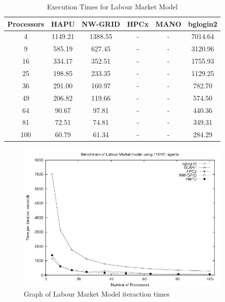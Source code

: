 {
\renewcommand{\arraystretch}{1.25}
\begin{table}[ht]
 \centering
  \begin{tabular}{c|ccccc}
 Processors &HAPU  &NW-GRID &HPCx  &MANO   &bglogin2 \\ \hline
 4   &1149.21   &1388.55  &-   &-   &7014.64  \\
 9   &585.19   &627.45   &-   &-   &3120.96  \\
 16   &334.17   &352.51   &-   &-   &1755.93  \\
 25   &198.85   &233.35   &-   &-   &1129.25   \\
 36   &291.00   &160.97   &-   &-   &782.70   \\
 49   &206.82   &119.66   &-   &-   &574.50   \\
 64   &90.67   &97.81   &-   &-   &440.36   \\
 81   &72.51   &74.81   &-   &-   &349.31   \\
 100   &60.79   &61.34   &-   &-   &284.29   \\
 \end{tabular}
 \caption{Execution Times for Labour Market Model}
 \label{tab:ExecutionTimesForLabour}
\end{table}
}
\bigskip
\begin{figure}[ht]
 \centering
  \includegraphics[width=300pt]{Labour2-graph.jpg}
 \caption{Graph of Labour Market Model iteraction times}
 \label{fig:Labour-graph}
\end{figure}

